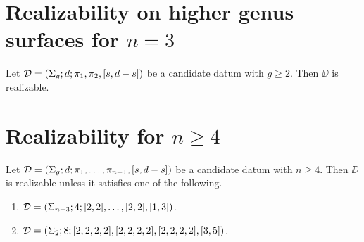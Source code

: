 \section{Realizability on higher genus surfaces for $n=3$}

\begin{theorem}\label{short-partition:th:realizability-on-higher-genus-n-3}
Let $\mathcal{D}=(\Sigma_{g};d;\pi_1,\pi_2,[s,d-s])$ be a candidate datum with $g\ge 2$. Then $\DD$ is realizable.
\end{theorem}

\section{Realizability for $n\ge 4$}

\begin{theorem}
Let $\mathcal{D}=(\Sigma_{g};d;\pi_1,\ldots,\pi_{n-1},[s,d-s])$ be a candidate datum with $n\ge 4$. Then $\DD$ is realizable unless it satisfies one of the following.
\begin{enumerate}[(1)]
\item $\mathcal{D}=(\Sigma_{n-3};4;[2,2],\ldots,[2,2],[1,3])$.
\item $\mathcal{D}=(\Sigma_{2};8;[2,2,2,2],[2,2,2,2],[2,2,2,2],[3,5])$.
\end{enumerate}
\end{theorem}
